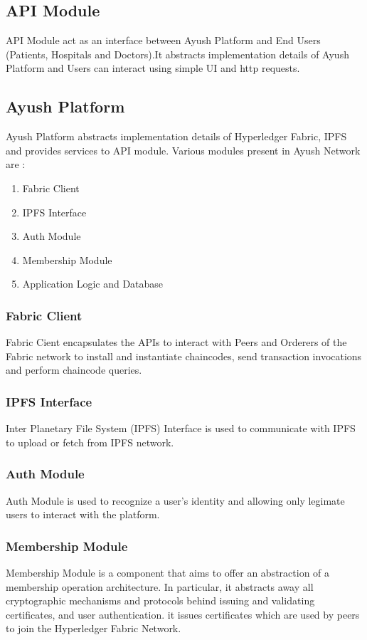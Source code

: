 \documentclass[11pt]{report}
\begin{document}
\subsection{API Module}
API Module act as an interface between Ayush Platform and End Users (Patients, Hospitals and Doctors).It abstracts implementation details of Ayush Platform and Users can interact using simple UI and http requests. 



\subsection{Ayush Platform}
Ayush Platform abstracts implementation details of Hyperledger Fabric, IPFS and provides services to API module. Various modules present in Ayush Network are :
\begin{enumerate}
    \item Fabric Client
    \item IPFS Interface
    \item Auth Module
    \item Membership Module
    \item Application Logic and Database
\end{enumerate}

\subsubsection{Fabric Client}
Fabric Cient encapsulates the APIs to interact with Peers and Orderers of the Fabric network to install and instantiate chaincodes, send transaction invocations and perform chaincode queries.

\subsubsection{IPFS Interface}
Inter Planetary File System (IPFS) Interface is used to communicate with IPFS to upload or fetch from IPFS network.
\subsubsection{Auth Module}
Auth Module is used to recognize a user's identity and allowing only legimate users to interact with the platform.

\subsubsection{Membership Module}
Membership Module is a component that aims to offer an abstraction of a membership operation architecture. In particular, it abstracts away all cryptographic mechanisms and protocols behind issuing and validating certificates, and user authentication. it issues certificates which are used by peers to join the Hyperledger Fabric Network.
\end{document}
